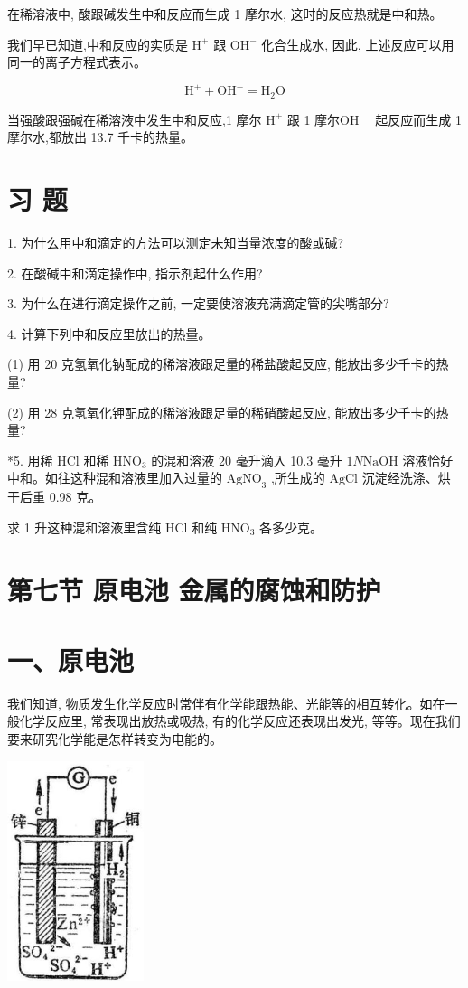 \documentclass[10pt]{article}
\begin{document}
在稀溶液中, 酸跟碱发生中和反应而生成 1 摩尔水, 这时的反应热就是中和热。

我们早已知道,中和反应的实质是 \({\mathrm{H}}^{ + }\) 跟 \({\mathrm{{OH}}}^{ - }\) 化合生成水, 因此, 上述反应可以用同一的离子方程式表示。

\[
{\mathrm{H}}^{ + } + {\mathrm{{OH}}}^{ - } = {\mathrm{H}}_{2}\mathrm{O}
\]

当强酸跟强碱在稀溶液中发生中和反应,1 摩尔 \({\mathrm{H}}^{ + }\) 跟 1 摩尔OH \({}^{ - }\) 起反应而生成 1 摩尔水,都放出 13.7 千卡的热量。

\section*{习 题}

1. 为什么用中和滴定的方法可以测定未知当量浓度的酸或碱?

2. 在酸碱中和滴定操作中, 指示剂起什么作用?

3. 为什么在进行滴定操作之前, 一定要使溶液充满滴定管的尖嘴部分?

4. 计算下列中和反应里放出的热量。

(1) 用 20 克氢氧化钠配成的稀溶液跟足量的稀盐酸起反应, 能放出多少千卡的热量?

(2) 用 28 克氢氧化钾配成的稀溶液跟足量的稀硝酸起反应, 能放出多少千卡的热量?

*5. 用稀 \(\mathrm{{HCl}}\) 和稀 \({\mathrm{{HNO}}}_{3}\) 的混和溶液 20 毫升滴入 10.3 毫升 \({1N}\mathrm{{NaOH}}\) 溶液恰好中和。如往这种混和溶液里加入过量的 \({\mathrm{{AgNO}}}_{3}\) ,所生成的 \(\mathrm{{AgCl}}\) 沉淀经洗涤、烘干后重 0.98 克。

求 1 升这种混和溶液里含纯 \(\mathrm{{HCl}}\) 和纯 \({\mathrm{{HNO}}}_{3}\) 各多少克。

\section*{第七节 原电池 金属的腐蚀和防护}

\section*{一、原电池}

我们知道, 物质发生化学反应时常伴有化学能跟热能、光能等的相互转化。如在一般化学反应里, 常表现出放热或吸热, 有的化学反应还表现出发光, 等等。现在我们要来研究化学能是怎样转变为电能的。

\begin{center}
\includegraphics[max width=0.3\textwidth]{images/01912d13-9986-7822-a012-3f3f7be99dcb_159_477158.jpg}
\end{center}
\end{document}
